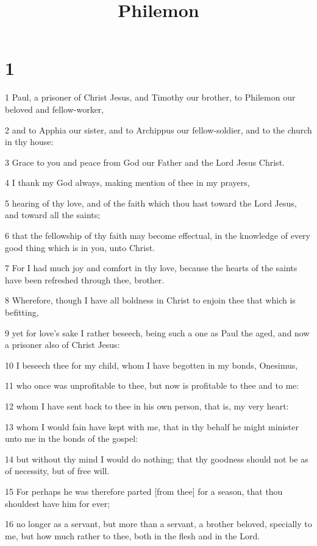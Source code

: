 

\title{Philemon}

\chapter{1}

\par 1 Paul, a prisoner of Christ Jesus, and Timothy our brother, to Philemon our beloved and fellow-worker,
\par 2 and to Apphia our sister, and to Archippus our fellow-soldier, and to the church in thy house:
\par 3 Grace to you and peace from God our Father and the Lord Jesus Christ.
\par 4 I thank my God always, making mention of thee in my prayers,
\par 5 hearing of thy love, and of the faith which thou hast toward the Lord Jesus, and toward all the saints;
\par 6 that the fellowship of thy faith may become effectual, in the knowledge of every good thing which is in you, unto Christ.
\par 7 For I had much joy and comfort in thy love, because the hearts of the saints have been refreshed through thee, brother.
\par 8 Wherefore, though I have all boldness in Christ to enjoin thee that which is befitting,
\par 9 yet for love's sake I rather beseech, being such a one as Paul the aged, and now a prisoner also of Christ Jesus:
\par 10 I beseech thee for my child, whom I have begotten in my bonds, Onesimus,
\par 11 who once was unprofitable to thee, but now is profitable to thee and to me:
\par 12 whom I have sent back to thee in his own person, that is, my very heart:
\par 13 whom I would fain have kept with me, that in thy behalf he might minister unto me in the bonds of the gospel:
\par 14 but without thy mind I would do nothing; that thy goodness should not be as of necessity, but of free will.
\par 15 For perhaps he was therefore parted [from thee] for a season, that thou shouldest have him for ever;
\par 16 no longer as a servant, but more than a servant, a brother beloved, specially to me, but how much rather to thee, both in the flesh and in the Lord.
